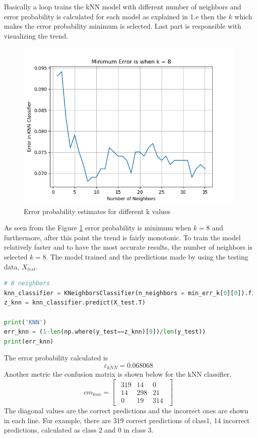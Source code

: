\documentclass[11pt]{article}
\begin{document}
Basically a loop trains the kNN model with different number of neighbors and error probability is calculated for each model as explained in 1.e then the $k$ which makes the error probability minimum is selected. Last part is responsible with visualizing the trend.

\begin{figure}[ht]
\centering
\includegraphics[width=0.75\columnwidth]{k_knn.png}
\captionsetup{justification=centering}
\caption{Error probability estimates for different k values}
\label{fig:k}
\end{figure}

As seen from the Figure \ref{fig:k} error probability is minimum when $k=8$ and furthermore, after this point the trend is fairly monotonic. To train the model relatively faster and to have the most accurate results, the number of neighbors is selected $k=8$. The model trained and the predictions made by using the testing data, $X_{test}$.

\begin{lstlisting}[language=Python, caption=kNN Classifier Hyperparameter Search]
# 8 neighbors
knn_classifier = KNeighborsClassifier(n_neighbors = min_err_k[0][0]).fit(X.T,y.T)
z_knn = knn_classifier.predict(X_test.T)

print('KNN')
err_knn = (1-len(np.where(y_test==z_knn)[0])/len(y_test))
print(err_knn)
\end{lstlisting}

The error probability calculated is 
$$
\varepsilon_{kNN} = 0.068068
$$
Another metric the confusion matrix is shown below for the kNN classifier.
$$
cm_{knn}=
 \begin{bmatrix}
 \begin{array}{rrr}
319 &  14 &   0 \\
 14 & 298 &  21 \\
  0 &  19 & 314
\end{array}   
\end{bmatrix}
$$
The diagonal values are the correct predictions and the incorrect ones are shown in each line. For example, there are 319 correct predictions of class1, 14 incorrect predictions, calculated as class 2 and 0 in class 3.
\end{document}
